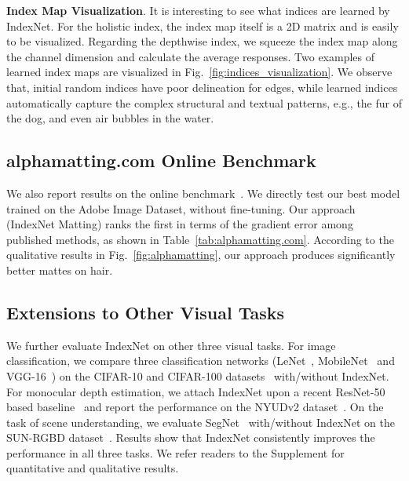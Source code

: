 \documentclass[10pt,twocolumn,letterpaper]{article}
\begin{document}
\vspace{3pt}
\noindent\textbf{Index Map Visualization}. It is interesting to see what indices are learned by IndexNet. For the holistic index, the index map itself is a 2D matrix and is easily to be visualized. Regarding the depthwise index, we squeeze the index map along the channel dimension and calculate the average responses. Two examples of learned index maps are visualized in Fig.~\ref{fig:indices_visualization}. We observe that, initial random indices have poor delineation for edges, while learned indices automatically capture the complex structural and textual patterns, e.g., the fur of the dog, and even air bubbles in the water.

\subsection{alphamatting.com Online Benchmark}

We also report results on the  online benchmark~\cite{rhemann2009perceptually}. We directly test our best model trained on the Adobe Image Dataset, without fine-tuning. Our approach (IndexNet Matting) ranks the first in terms of the gradient error among published methods, as shown in Table~\ref{tab:alphamatting.com}. According to the qualitative results in Fig.~\ref{fig:alphamatting}, our approach produces significantly better mattes on hair.



\subsection{Extensions to Other Visual Tasks}

We further evaluate IndexNet on other three visual tasks. For image classification, we compare three classification networks (LeNet~\cite{lecun1998gradient}, MobileNet~\cite{howard2017mobilenets} and VGG-16~\cite{simonyan2014very}) on the CIFAR-10 and CIFAR-100 datasets~\cite{krizhevsky2009learning} with/without IndexNet. For monocular depth estimation, we attach IndexNet upon a recent ResNet-50 based baseline~\cite{hu2019revisiting} and report the performance on the NYUDv2 dataset~\cite{silberman2012indoor}. On the task of scene understanding, we evaluate SegNet~\cite{badrinarayanan2017segnet} with/without IndexNet on the SUN-RGBD dataset~\cite{song2015sun}. Results show that IndexNet consistently improves the performance in all three tasks. We refer readers to the Supplement for quantitative and qualitative results.
\end{document}
